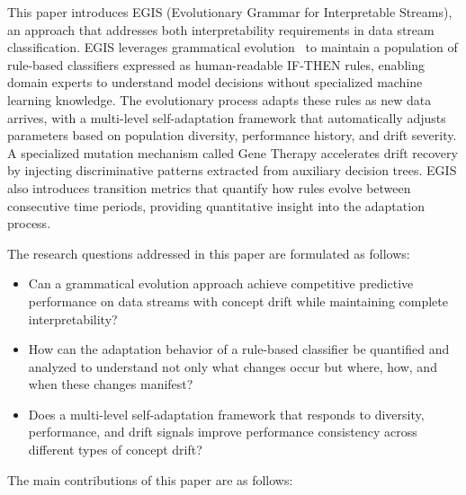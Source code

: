 \documentclass[lettersize,journal]{IEEEtran}
\begin{document}
This paper introduces EGIS (Evolutionary Grammar for Interpretable Streams), an approach that addresses both interpretability requirements in data stream classification. EGIS leverages grammatical evolution~\cite{oneill2003grammatical} to maintain a population of rule-based classifiers expressed as human-readable IF-THEN rules, enabling domain experts to understand model decisions without specialized machine learning knowledge. The evolutionary process adapts these rules as new data arrives, with a multi-level self-adaptation framework that automatically adjusts parameters based on population diversity, performance history, and drift severity. A specialized mutation mechanism called Gene Therapy accelerates drift recovery by injecting discriminative patterns extracted from auxiliary decision trees. EGIS also introduces transition metrics that quantify how rules evolve between consecutive time periods, providing quantitative insight into the adaptation process.

The research questions addressed in this paper are formulated as follows:

\begin{itemize}
    \item[\textbf{RQ1:}] Can a grammatical evolution approach achieve competitive predictive performance on data streams with concept drift while maintaining complete interpretability?

    \item[\textbf{RQ2:}] How can the adaptation behavior of a rule-based classifier be quantified and analyzed to understand not only what changes occur but where, how, and when these changes manifest?

    \item[\textbf{RQ3:}] Does a multi-level self-adaptation framework that responds to diversity, performance, and drift signals improve performance consistency across different types of concept drift?
\end{itemize}

The main contributions of this paper are as follows:
\end{document}
